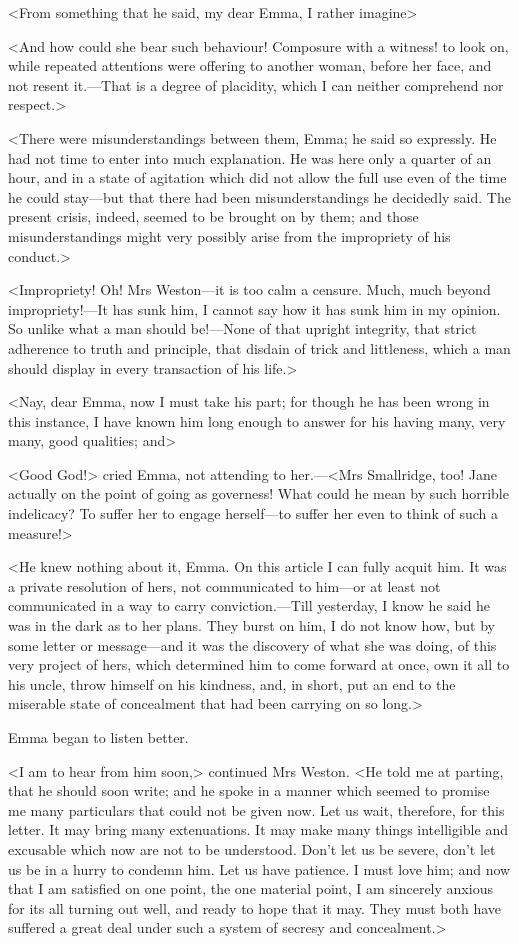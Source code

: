 <From something that he said, my dear Emma, I rather imagine\longdash>

<And how could she bear such behaviour! Composure with a witness! to look on, while repeated attentions were offering to another woman, before her face, and not resent it.—That is a degree of placidity, which I can neither comprehend nor respect.>

<There were misunderstandings between them, Emma; he said so expressly. He had not time to enter into much explanation. He was here only a quarter of an hour, and in a state of agitation which did not allow the full use even of the time he could stay—but that there had been misunderstandings he decidedly said. The present crisis, indeed, seemed to be brought on by them; and those misunderstandings might very possibly arise from the impropriety of his conduct.>

<Impropriety! Oh! Mrs Weston—it is too calm a censure. Much, much beyond impropriety!—It has sunk him, I cannot say how it has sunk him in my opinion. So unlike what a man should be!—None of that upright integrity, that strict adherence to truth and principle, that disdain of trick and littleness, which a man should display in every transaction of his life.>

<Nay, dear Emma, now I must take his part; for though he has been wrong in this instance, I have known him long enough to answer for his having many, very many, good qualities; and\longdash>

<Good God!> cried Emma, not attending to her.—<Mrs Smallridge, too! Jane actually on the point of going as governess! What could he mean by such horrible indelicacy? To suffer her to engage herself—to suffer her even to think of such a measure!>

<He knew nothing about it, Emma. On this article I can fully acquit him. It was a private resolution of hers, not communicated to him—or at least not communicated in a way to carry conviction.—Till yesterday, I know he said he was in the dark as to her plans. They burst on him, I do not know how, but by some letter or message—and it was the discovery of what she was doing, of this very project of hers, which determined him to come forward at once, own it all to his uncle, throw himself on his kindness, and, in short, put an end to the miserable state of concealment that had been carrying on so long.>

Emma began to listen better.

<I am to hear from him soon,> continued Mrs Weston. <He told me at parting, that he should soon write; and he spoke in a manner which seemed to promise me many particulars that could not be given now. Let us wait, therefore, for this letter. It may bring many extenuations. It may make many things intelligible and excusable which now are not to be understood. Don't let us be severe, don't let us be in a hurry to condemn him. Let us have patience. I must love him; and now that I am satisfied on one point, the one material point, I am sincerely anxious for its all turning out well, and ready to hope that it may. They must both have suffered a great deal under such a system of secresy and concealment.>

